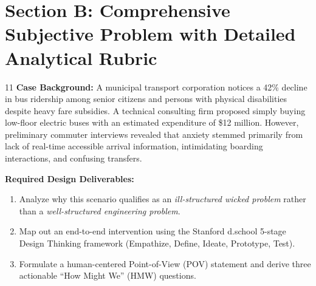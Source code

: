 \newpage
\section{Section B: Comprehensive Subjective Problem with Detailed Analytical Rubric}

\begin{subjectiveq}{1}{1}
\textbf{Case Background:} A municipal transport corporation notices a 42\% decline in bus ridership among senior citizens and persons with physical disabilities despite heavy fare subsidies. A technical consulting firm proposed simply buying low-floor electric buses with an estimated expenditure of \$12 million. However, preliminary commuter interviews revealed that anxiety stemmed primarily from lack of real-time accessible arrival information, intimidating boarding interactions, and confusing transfers.

\textbf{Required Design Deliverables:}
\begin{enumerate}[label=(\alph*)]
    \item Analyze why this scenario qualifies as an \textit{ill-structured wicked problem} rather than a \textit{well-structured engineering problem}.
    \item Map out an end-to-end intervention using the Stanford d.school 5-stage Design Thinking framework (Empathize, Define, Ideate, Prototype, Test).
    \item Formulate a human-centered Point-of-View (POV) statement and derive three actionable ``How Might We'' (HMW) questions.
\end{enumerate}
\end{subjectiveq}

